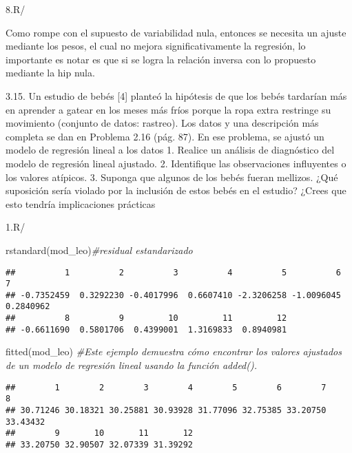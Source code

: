 \documentclass[
]{article}
\newenvironment{Shaded}{\begin{snugshade}}{\end{snugshade}}
\newcommand{\CommentTok}[1]{\textcolor[rgb]{0.56,0.35,0.01}{\textit{#1}}}
\newcommand{\FunctionTok}[1]{\textcolor[rgb]{0.00,0.00,0.00}{#1}}
\newcommand{\NormalTok}[1]{#1}
\begin{document}
8.R/

Como rompe con el supuesto de variabilidad nula, entonces se necesita un
ajuste mediante los pesos, el cual no mejora significativamente la
regresión, lo importante es notar es que si se logra la relación inversa
con lo propuesto mediante la hip nula.

3.15. Un estudio de bebés {[}4{]} planteó la hipótesis de que los bebés
tardarían más en aprender a gatear en los meses más fríos porque la ropa
extra restringe su movimiento (conjunto de datos: rastreo). Los datos y
una descripción más completa se dan en Problema 2.16 (pág. 87). En ese
problema, se ajustó un modelo de regresión lineal a los datos 1. Realice
un análisis de diagnóstico del modelo de regresión lineal ajustado. 2.
Identifique las observaciones influyentes o los valores atípicos. 3.
Suponga que algunos de los bebés fueran mellizos. ¿Qué suposición sería
violado por la inclusión de estos bebés en el estudio? ¿Crees que esto
tendría implicaciones prácticas

1.R/

\begin{Shaded}
\begin{Highlighting}[]
\FunctionTok{rstandard}\NormalTok{(mod\_leo)}\CommentTok{\#residual estandarizado}
\end{Highlighting}
\end{Shaded}

\begin{verbatim}
##          1          2          3          4          5          6          7 
## -0.7352459  0.3292230 -0.4017996  0.6607410 -2.3206258 -1.0096045  0.2840962 
##          8          9         10         11         12 
## -0.6611690  0.5801706  0.4399001  1.3169833  0.8940981
\end{verbatim}

\begin{Shaded}
\begin{Highlighting}[]
\FunctionTok{fitted}\NormalTok{(mod\_leo) }\CommentTok{\#Este ejemplo demuestra cómo encontrar los valores ajustados de un modelo de regresión lineal usando la función added().}
\end{Highlighting}
\end{Shaded}

\begin{verbatim}
##        1        2        3        4        5        6        7        8 
## 30.71246 30.18321 30.25881 30.93928 31.77096 32.75385 33.20750 33.43432 
##        9       10       11       12 
## 33.20750 32.90507 32.07339 31.39292
\end{verbatim}
\end{document}

